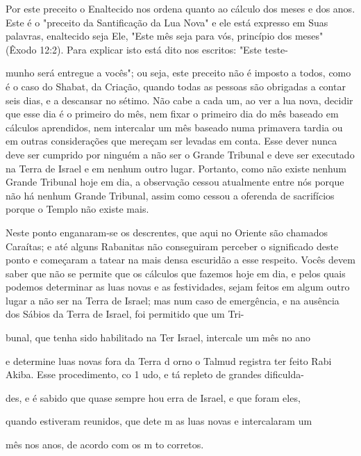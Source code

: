 \begin{itemize}
\begin{enumrate}
\begin{itemize}
\begin{itemize}
\begin{itemize}
Por este preceito o Enaltecido nos ordena quanto ao cálculo dos me­ses e
dos anos. Este é o "preceito da Santificação da Lua Nova" e ele está
ex­presso em Suas palavras, enaltecido seja Ele, "Este mês seja para
vós, princípio dos meses" (Êxodo 12:2). Para explicar isto está dito nos
escritos: "Este teste-



munho será entregue a vocês"; ou seja, este preceito não é imposto a
todos, como é o caso do Shabat, da Criação, quando todas as pessoas são
obrigadas a contar seis dias, e a descansar no sétimo. Não cabe a cada
um, ao ver a lua nova, decidir que esse dia é o primeiro do mês, nem
fixar o primeiro dia do mês baseado em cálculos aprendidos, nem
intercalar um mês baseado numa primavera tardia ou em outras
considerações que mereçam ser levadas em con­ta. Esse dever nunca deve
ser cumprido por ninguém a não ser o Grande Tri­bunal e deve ser
executado na Terra de Israel e em nenhum outro lugar. Por­tanto, como
não existe nenhum Grande Tribunal hoje em dia, a observação cessou
atualmente entre nós porque não há nenhum Grande Tribunal, assim como
cessou a oferenda de sacrifícios porque o Templo não existe mais.

Neste ponto enganaram-se os descrentes, que aqui no Oriente são chamados
Caraítas; e até alguns Rabanitas não conseguiram perceber o signifi­cado
deste ponto e começaram a tatear na mais densa escuridão a esse
respeito. Vocês devem saber que não se permite que os cálculos que
fazemos hoje em dia, e pelos quais podemos determinar as luas novas e as
festividades, sejam feitos em algum outro lugar a não ser na Terra de
Israel; mas num caso de emer­gência, e na ausência dos Sábios da Terra
de Israel, foi permitido que um Tri-

bunal, que tenha sido habilitado na Ter Israel, intercale um mês no ano

e determine luas novas fora da Terra d orno o Talmud registra ter feito
 Rabi Akiba. Esse procedimento, co 1 udo, e tá repleto de grandes
 dificulda-


des, e é sabido que quase sempre hou erra de Israel, e que foram eles,

quando estiveram reunidos, que dete m as luas novas e intercalaram um

mês nos anos, de acordo com os m to corretos.


\end{itemize}
\end{itemize}
\end{itemize}
\end{enumrate}
\end{itemize}
